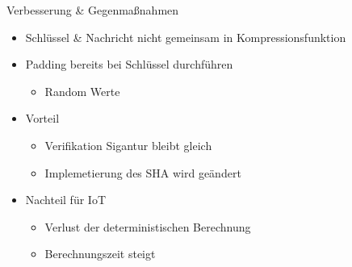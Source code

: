 \documentclass[
  11 pt,
  ignorenonframetext,
  aspectratio=43,
]{beamer}
\providecommand{\tightlist}{%
  \setlength{\itemsep}{0pt}\setlength{\parskip}{0pt}}
\begin{document}
\begin{frame}{Verbesserung \& Gegenmaßnahmen}
\protect\hypertarget{verbesserung-gegenmauxdfnahmen}{}
\begin{itemize}
\tightlist
\item
  Schlüssel \& Nachricht nicht gemeinsam in Kompressionsfunktion
\end{itemize}

\pause

\begin{itemize}
\tightlist
\item
  Padding bereits bei Schlüssel durchführen

  \begin{itemize}
  \tightlist
  \item
    Random Werte
  \end{itemize}
\end{itemize}

\pause

\begin{itemize}
\tightlist
\item
  Vorteil

  \begin{itemize}
  \tightlist
  \item
    Verifikation Sigantur bleibt gleich
  \item
    Implemetierung des SHA wird geändert
  \end{itemize}
\end{itemize}

\pause

\begin{itemize}
\tightlist
\item
  Nachteil für IoT

  \begin{itemize}
  \tightlist
  \item
    Verlust der deterministischen Berechnung
  \item
    Berechnungszeit steigt
  \end{itemize}
\end{itemize}
\end{frame}
\end{document}
